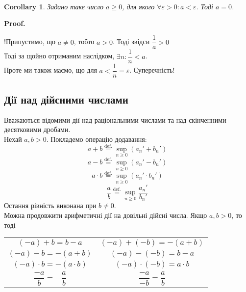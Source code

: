 \documentclass[a4paper, 14pt]{article}
\makeatletter
\def\qed{$\blacksquare$}
\theoremstyle{theoremdd}
\theoremstyle{theoremdd}
\theoremstyle{theoremdd}
\theoremstyle{theoremdd}
\theoremstyle{theoremdd}
\theoremstyle{theoremdd}
\theoremstyle{theoremdd}
\theoremstyle{theoremdd}
\newtheorem{corollary}[theorem]{Corollary}
\renewenvironment{proof}[1][Proof.\\]{\par
\pushQED{\hfill \qed}%
\normalfont \topsep6\p@\@plus6\p@\relax
\trivlist
\item\relax
{\bfseries
#1\@addpunct{.}}\hspace\labelsep\ignorespaces
}{%
\popQED\endtrivlist\@endpefalse
}
\makeatother
\begin{document}
	\begin{corollary}
	Задано таке число $a \geq 0$, для якого $\forall \varepsilon > 0: a < \varepsilon$. Тоді $a = 0$.
	\end{corollary}
	
	\begin{proof}
	!Припустимо, що $a \neq 0$, тобто $a > 0$. Тоді звідси $\dfrac{1}{a} > 0$\\
	Тоді за щойно отриманим наслідком, $\exists n: \dfrac{1}{n} < a$.\\
	Проте ми також маємо, що для $a < \dfrac{1}{n} = \varepsilon$. Суперечність!
	\end{proof}
	
	\iffalse
	\subsection{Дії над дійсними числами}
	Вважаються відомими дії над раціональними числами та над скінченними десятковими дробами.\\
	Нехай $a,b > 0$. Покладемо операцію додавання:
	$$ a + b \overset{\text{def.}}{=} \sup_{n \geq 0} (a_n' + b_n') $$
	$$ a - b \overset{\text{def.}}{=} \sup_{n \geq 0} (a_n' - b_n') $$
	$$ a \cdot b \overset{\text{def.}}{=} \sup_{n \geq 0} (a_n' \cdot b_n') $$
	$$ \frac{a}{b} \overset{\text{def.}}{=} \sup_{n \geq 0} \frac{a_n'}{b_n'} $$
	Остання рівність виконана при $b \neq 0$.\\
	Можна продовжити арифметичні дії на довільні дійсні числа. Якщо $a,b > 0$, то тоді
	\begin{center}
	\begin{tabular}{cc}
	$(-a) + b = b - a$ & $(-a) + (-b) = -(a+b)$ \\
	$(-a) - b = -(a+b)$ & $(-a) - (-b) = b-a$ \\
	$(-a) \cdot b = - (a \cdot b)$ & $(-a) \cdot (-b) = a \cdot b$ \\
	$\dfrac{-a}{b} = - \dfrac{a}{b}$ & $\dfrac{-a}{-b} = \dfrac{a}{b}$
	\end{tabular}
	\end{center}
	
\end{document}
